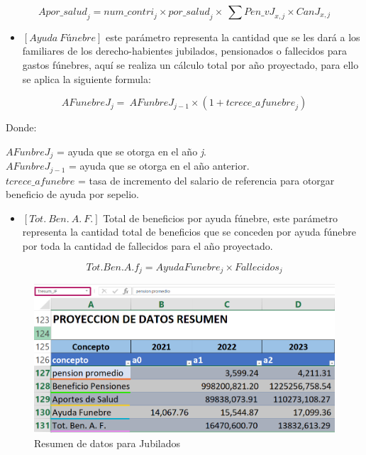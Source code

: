 \documentclass[
  letterpaper,
  DIV=11,
  numbers=noendperiod]{scrreprt}
\providecommand{\tightlist}{%
  \setlength{\itemsep}{0pt}\setlength{\parskip}{0pt}}\usepackage{longtable,booktabs,array}
\begin{document}
\begin{equation}
{Apor\_salud}_j={num\_contri}_j\times{por\_salud}_j\times\ \sum{{Pen\_vJ}_{x,j}\times{CanJ}_{x,j}}
\end{equation}

\begin{itemize}
\tightlist
\item
  \([Ayuda\ Fúnebre]\) este parámetro representa la cantidad que se les
  dará a los familiares de los derecho-habientes jubilados, pensionados
  o fallecidos para gastos fúnebres, aquí se realiza un cálculo total
  por año proyectado, para ello se aplica la siguiente formula:
\end{itemize}

\begin{equation}
AFunebr{eJ}_j=\ AFunbr{eJ}_{j-1}\times(1+{tcrece\_afunebre}_j)
\end{equation}

Donde:

\(AFunbr{eJ}_j\) = ayuda que se otorga en el año \emph{j}.\\
\(AFunbr{eJ}_{j-1}\) = ayuda que se otorga en el año anterior.\\
\(tcrece\_afunebre\) = tasa de incremento del salario de referencia para
otorgar beneficio de ayuda por sepelio.

\begin{itemize}
\tightlist
\item
  \([Tot.\ Ben.\ A.\ F.]\) Total de beneficios por ayuda fúnebre, este
  parámetro representa la cantidad total de beneficios que se conceden
  por ayuda fúnebre por toda la cantidad de fallecidos para el año
  proyectado.
\end{itemize}

\begin{equation}
Tot.Ben.A.f_j = AyudaFunebre_j\times{Fallecidos}_j
\end{equation}

\begin{figure}

{\centering \includegraphics{images/F/Img29.png}

}

\caption{Resumen de datos para Jubilados}

\end{figure}
\end{document}
